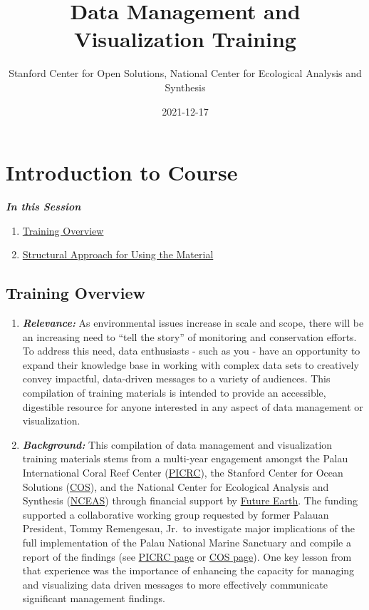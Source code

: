 \documentclass[
]{book}
\title{Data Management and Visualization Training}
\author{Stanford Center for Open Solutions, National Center for Ecological Analysis and Synthesis}
\date{2021-12-17}
\providecommand{\tightlist}{%
  \setlength{\itemsep}{0pt}\setlength{\parskip}{0pt}}
\begin{document}
\maketitle

{
\setcounter{tocdepth}{1}
\tableofcontents
}
\hypertarget{introduction-to-course}{%
\chapter{Introduction to Course}\label{introduction-to-course}}

\textbf{\emph{In this Session}}

\begin{enumerate}
\def\labelenumi{\arabic{enumi}.}
\tightlist
\item
  \protect\hyperlink{training-overview}{Training Overview}
\item
  \protect\hyperlink{how-to-use-these-materials}{Structural Approach for Using the Material}
\end{enumerate}

\hypertarget{training-overview}{%
\section{Training Overview}\label{training-overview}}

\begin{enumerate}
\def\labelenumi{\arabic{enumi}.}
\item
  \textbf{\emph{Relevance:}} As environmental issues increase in scale and scope, there will be an increasing need to ``tell the story'' of monitoring and conservation efforts. To address this need, data enthusiasts - such as you - have an opportunity to expand their knowledge base in working with complex data sets to creatively convey impactful, data-driven messages to a variety of audiences. This compilation of training materials is intended to provide an accessible, digestible resource for anyone interested in any aspect of data management or visualization.
\item
  \textbf{\emph{Background:}} This compilation of data management and visualization training materials stems from a multi-year engagement amongst the Palau International Coral Reef Center (\href{https://picrc.org/picrcpage/}{PICRC}), the Stanford Center for Ocean Solutions (\href{https://oceansolutions.stanford.edu/}{COS}), and the National Center for Ecological Analysis and Synthesis (\href{https://www.nceas.ucsb.edu/}{NCEAS}) through financial support by \href{https://futureearth.org/}{Future Earth}. The funding supported a collaborative working group requested by former Palauan President, Tommy Remengesau, Jr.~to investigate major implications of the full implementation of the Palau National Marine Sanctuary and compile a report of the findings (see \href{https://picrc.org/picrcpage/palau-national-marine-sanctuary/}{PICRC page} or \href{https://oceansolutions.stanford.edu/pnms-report}{COS page}). One key lesson from that experience was the importance of enhancing the capacity for managing and visualizing data driven messages to more effectively communicate significant management findings.
\end{enumerate}
\end{document}
